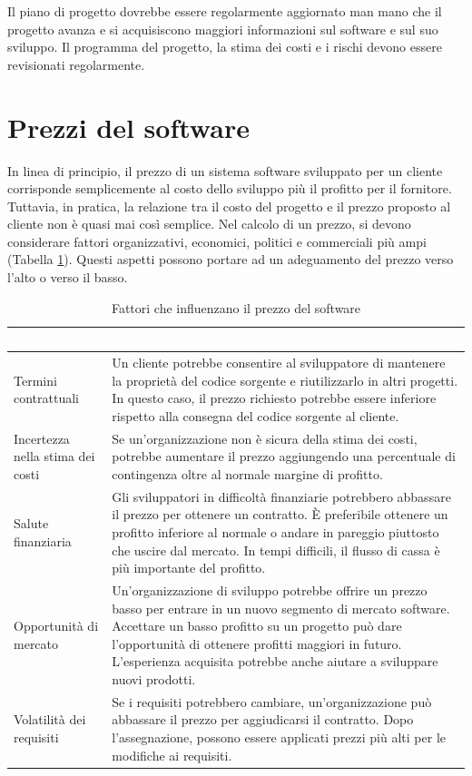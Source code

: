 Il piano di progetto dovrebbe essere regolarmente aggiornato man mano che il progetto avanza e si acquisiscono maggiori informazioni sul software e sul suo sviluppo. Il programma del progetto, la stima dei costi e i rischi devono essere revisionati regolarmente.

\section{Prezzi del software}
In linea di principio, il prezzo di un sistema software sviluppato per un cliente corrisponde semplicemente al costo dello sviluppo più il profitto per il fornitore. Tuttavia, in pratica, la relazione tra il costo del progetto e il prezzo proposto al cliente non è quasi mai così semplice. Nel calcolo di un prezzo, si devono considerare fattori organizzativi, economici, politici e commerciali più ampi (Tabella \ref{tab:factors-software-pricing}). Questi aspetti possono portare ad un adeguamento del prezzo verso l’alto o verso il basso.

\begin{table}[ht]
\centering
{}
\begin{tabular}{|p{3.5cm}|p{11cm}|}
\hline
\rowcolor{headerblue}
\textbf{\textcolor{white}{Fattore}} & \textbf{\textcolor{white}{Descrizione}} \\\hline
Termini contrattuali & Un cliente potrebbe consentire al sviluppatore di mantenere la proprietà del codice sorgente e riutilizzarlo in altri progetti. In questo caso, il prezzo richiesto potrebbe essere inferiore rispetto alla consegna del codice sorgente al cliente.\\\hline
Incertezza nella stima dei costi & Se un'organizzazione non è sicura della stima dei costi, potrebbe aumentare il prezzo aggiungendo una percentuale di contingenza oltre al normale margine di profitto.\\\hline
Salute finanziaria & Gli sviluppatori in difficoltà finanziarie potrebbero abbassare il prezzo per ottenere un contratto. È preferibile ottenere un profitto inferiore al normale o andare in pareggio piuttosto che uscire dal mercato. In tempi difficili, il flusso di cassa è più importante del profitto.\\\hline
Opportunità di mercato & Un'organizzazione di sviluppo potrebbe offrire un prezzo basso per entrare in un nuovo segmento di mercato software. Accettare un basso profitto su un progetto può dare l'opportunità di ottenere profitti maggiori in futuro. L'esperienza acquisita potrebbe anche aiutare a sviluppare nuovi prodotti.\\\hline
Volatilità dei requisiti & Se i requisiti potrebbero cambiare, un'organizzazione può abbassare il prezzo per aggiudicarsi il contratto. Dopo l'assegnazione, possono essere applicati prezzi più alti per le modifiche ai requisiti.
\\\hline
\end{tabular}
\caption{Fattori che influenzano il prezzo del software}
\label{tab:factors-software-pricing}
\end{table}

